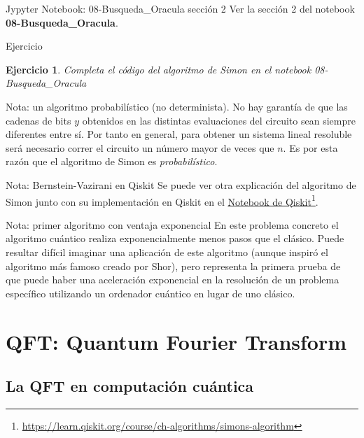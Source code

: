 \documentclass[a4paper,11pt]{book} %
\newtheorem{ejercicio_contador}{Ejercicio}
\newcommand{\Ejercicio}[1]{
		\begin{mybox_gray}{Ejercicio} 
			\begin{ejercicio_contador}
				 #1 
			\end{ejercicio_contador} 
		\end{mybox_gray}
	}
\numberwithin{equation}{chapter}
\begin{document}
	\begin{mybox_orange}{Jypyter Notebook: 08-Busqueda\_Oracula sección 2}
	Ver la sección 2 del notebook \textbf{08-Busqueda\_Oracula}.
	\end{mybox_orange}

	\Ejercicio{
	Completa el código del algoritmo de Simon en el notebook 08-Busqueda\_Oracula
	}

	\begin{mybox_blue}{Nota: un algoritmo probabilístico (no determinista).}
	No hay garantía de que las cadenas de bits $y$ obtenidos en las distintas evaluaciones del circuito sean siempre diferentes entre sí. 
	Por tanto en general, para obtener un sistema lineal resoluble será necesario correr el circuito un número mayor de veces que $n$.  
	Es por esta razón que el algoritmo de Simon es \textit{probabilístico}.
	\end{mybox_blue}

	\begin{mybox_blue}{Nota: Bernstein-Vazirani en Qiskit}
	Se puede ver otra explicación del algoritmo de  Simon junto con su implementación en Qiskit en el 
	\href{https://learn.qiskit.org/course/ch-algorithms/simons-algorithm}{Notebook de Qiskit}\footnote{\url{https://learn.qiskit.org/course/ch-algorithms/simons-algorithm}}.
	\end{mybox_blue}
	
	

	\begin{mybox_blue}{Nota: primer algoritmo con ventaja exponencial}
	En este problema concreto el algoritmo cuántico realiza exponencialmente menos pasos que el clásico. Puede resultar difícil imaginar una aplicación de este algoritmo 
	(aunque inspiró el algoritmo más famoso creado por Shor), pero representa la primera prueba de que puede haber una aceleración exponencial en la resolución de un 
	problema específico utilizando un ordenador cuántico en lugar de uno clásico.
	\end{mybox_blue}


	



\chapter{QFT: Quantum Fourier Transform} \label{chapter_QFT}

	\section{La QFT en computación cuántica}
	
\end{document}
